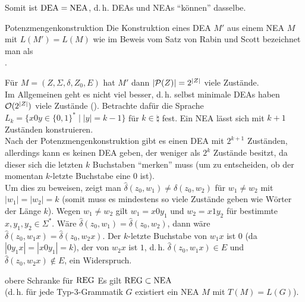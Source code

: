\begin{Bem}
    Somit ist $\DEA = \NEA$, d.\,h. DEAs und NEAs "`können"' dasselbe.
\end{Bem}

\linie

\begin{Def}{Potenzmengenkonstruktion}
    Die Konstruktion eines DEA $M'$ aus einem NEA $M$ mit $L(M') = L(M)$
    wie im Beweis vom Satz von Rabin und Scott bezeichnet man als\\
    .
\end{Def}

\begin{Bem}
    Für $M = (Z, \Sigma, \delta, Z_0, E)$ hat
    $M'$ dann $|\P(Z)| = 2^{|Z|}$ viele Zustände.\\
    Im Allgemeinen geht es nicht viel besser, d.\,h. selbst minimale DEAs
    haben $\O(2^{|Z|})$ viele Zustände ().
    Betrachte dafür die Sprache $L_k = \{x0y \in \{0, 1\}^\ast \;|\;
    |y| = k - 1\}$ für $k \in \natural$ fest.
    Ein NEA lässt sich mit $k + 1$ Zuständen konstruieren.\\
    Nach der Potenzmengenkonstruktion gibt es
    einen DEA mit $2^{k+1}$ Zuständen, allerdings kann es keinen DEA geben,
    der weniger als $2^k$ Zustände besitzt,
    da dieser sich die letzten $k$ Buchstaben "`merken"' muss
    (um zu entscheiden, ob der momentan $k$-letzte Buchstabe eine $0$ ist).\\
    Um dies zu beweisen, zeigt man
    $\widehat{\delta}(z_0, w_1) \not= \widehat{\delta}(z_0, w_2)$ für
    $w_1 \not= w_2$ mit $|w_1| = |w_2| = k$
    (somit muss es mindestens so viele Zustände geben wie
    Wörter der Länge $k$).
    Wegen $w_1 \not= w_2$ gilt $w_1 = x0y_1$ und $w_2 = x1y_2$ für
    bestimmte $x, y_1, y_2 \in \Sigma^\ast$.
    Wäre $\widehat{\delta}(z_0, w_1) = \widehat{\delta}(z_0, w_2)$, dann
    wäre $\widehat{\delta}(z_0, w_1 x) = \widehat{\delta}(z_0, w_2 x)$.
    Der $k$-letzte Buchstabe von $w_1 x$ ist $0$
    (da $|0y_1 x| = |x0y_1| = k$), der von $w_2 x$ ist $1$,
    d.\,h. $\widehat{\delta}(z_0, w_1 x) \in E$ und
    $\widehat{\delta}(z_0, w_2 x) \notin E$, ein Widerspruch.
\end{Bem}

\begin{Satz}{obere Schranke für $\REG$}
    Es gilt $\REG \subset \NEA$\\
    (d.\,h. für jede Typ-3-Grammatik $G$ existiert ein NEA $M$ mit
    $T(M) = L(G)$).
\end{Satz}

